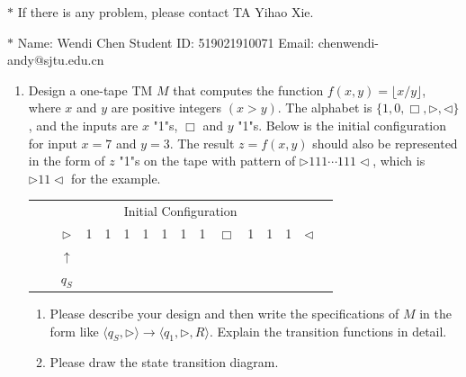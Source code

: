 \documentclass[12pt,a4paper]{article}
\theoremstyle{definition}
\begin{document}
\noindent

\noindent{}
\begin{center}
\footnotesize{\color{red}$*$ If there is any problem, please contact TA Yihao Xie. }

\footnotesize{\color{blue}$*$ Name: Wendi Chen  \quad Student ID: 519021910071 \quad Email: chenwendi-andy@sjtu.edu.cn}
\end{center}

\begin{enumerate}
    \item Design a one-tape TM $M$ that computes the function $f(x, y) = \lfloor x/y \rfloor$, where $x$ and $y$ are positive integers $(x > y)$. The alphabet is $\{1, 0, \Box, \triangleright, \triangleleft\}$, and the inputs are $x$ "1"s, $\Box$ and $y$ "1"s. Below is the initial configuration for input $x=7$ and $y=3$. The result $z=f(x,y)$ should also be represented in the form of $z$ "1"s on the tape with pattern of $\rhd 111\cdots 111\lhd$, which is $\rhd 11\lhd$ for the example.
    
	\begin{center}
		\begin{tabular}{ll|c|c|c|c|c|c|c|c|c|c|c|c|c|c}
			& \multicolumn{14}{c}{Initial Configuration}\\[5pt]
			\cline{2-16}
			& & $\triangleright$ &  1  & 1 & 1 & 1 & 1 & 1 & 1 & $\Box$ & 1 & 1 & 1 & $ \triangleleft$ & \\
			\cline{2-16}
			\multicolumn{2}{c}{} & \multicolumn{1}{c}{$\uparrow$} & \multicolumn{11}{c}{}\\[-4px]
			\multicolumn{2}{c}{} & \multicolumn{1}{c}{$q_S$} & \multicolumn{11}{c}{}	
		\end{tabular}
	\end{center}

    \begin{enumerate}
	\item
	Please describe your design and then write the specifications of $M$ in the form like $\langle q_S, \triangleright \rangle \rightarrow \langle q_1, \triangleright,  R\rangle$. Explain the transition functions in detail.
	
	\item
	Please draw the state transition diagram.
	

\end{enumerate}
\end{enumerate}
\end{document}
